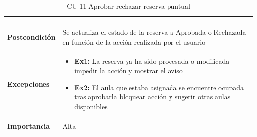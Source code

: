 \begin{table}[p]
\begin{tabularx}{\linewidth}{ p{} p{} }
\begin{enumerate}
		\end{enumerate}\\
		\textbf{Postcondición} & Se actualiza el estado de la reserva a Aprobada o Rechazada en función de la acción realizada por el usuario \\
		\textbf{Excepciones}          & 
		\begin{itemize}
			\tightlist
			\item \textbf{Ex1:} La reserva ya ha sido procesada o modificada \textrightarrow{} impedir la acción y mostrar el aviso
			\item \textbf{Ex2:} El aula que estaba asignada se encuentre ocupada tras aprobarla \textrightarrow{} bloquear acción y sugerir otras aulas disponibles
			
		\end{itemize} \\
		\textbf{Importancia}          & Alta \\
		\bottomrule
	\end{tabularx}
	\caption{CU-11 Aprobar rechazar reserva puntual}
\end{table}

